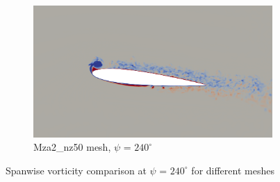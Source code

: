 \begin{figure}[H]
	\begin{subfigure}[b]{0.6\textwidth}
		\centering
		\includegraphics[width=1\textwidth]{figures/zonal_adapt_results/vorticity_plots_Re200k/Mza2_50/phase_240.png}
		\caption{Mza2\_nz50 mesh, $\psi$ = $240^\circ$}
		\label{fig:Mza2_50_Re200k_sp_psi240}
	\end{subfigure}	
	\caption{Spanwise vorticity comparison at $\psi$ = $240^\circ$ for different meshes}
	\label{fig:vorticity_Re200k_sp_240}
\end{figure}


